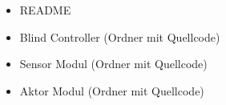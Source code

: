 \setcounter{chapter}{1}
\setcounter{section}{0}
\setcounter{table}{0}
\setcounter{figure}{0}

\begin{itemize}
	\item README
	\item Blind Controller (Ordner mit Quellcode)
	\item Sensor Modul (Ordner mit Quellcode)
	\item Aktor Modul (Ordner mit Quellcode)
\end{itemize}